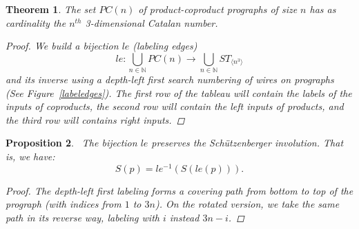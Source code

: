 \documentclass{amsart}
\newtheorem{theorem}{Theorem}[section]
\newtheorem{proposition}[theorem]{Proposition}
\begin{document}
\begin{theorem}
  The set $PC(n)$ of product-coproduct prographs of size $n$ has as
  cardinality the $n^{th}$ 3-dimensional Catalan number.
  \begin{proof}
    We build a bijection $le$ (labeling edges)
    \begin{displaymath}
      le : \displaystyle\bigcup_{n \in \mathbb{N}} PC(n) \rightarrow
      \displaystyle\bigcup_{n \in \mathbb{N}} ST_{\langle n^3 \rangle}
    \end{displaymath}
    and its inverse using a depth-left first search numbering of
    wires on prographs (See Figure~\ref{labeledges}). The first row
    of the tableau will contain the labels of the inputs of coproducts,
    the second row will contain the left inputs of products, and the
    third row will contains right inputs. 
  \end{proof}
\end{theorem}

\begin{proposition}~\label{prop_schutz}
  The bijection $le$ preserves the Schützenberger involution. That is, we have:
  \begin{displaymath}
    S(p) = le^{-1}(  S(  le(p))).
  \end{displaymath}
  \begin{proof}
    The depth-left first labeling forms a covering path from bottom to
    top of the prograph (with indices from $1$ to $3n$). On the
    rotated version, we take the same path in its reverse way,
    labeling with $i$ instead $3n-i$.
  \end{proof}
\end{proposition}
\end{document}

